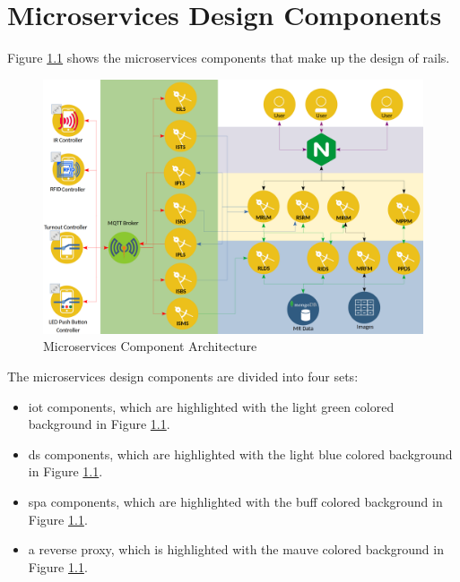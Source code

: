 \chapter{Microservices Design Components}
Figure \ref{fig:microarchitecture} shows the microservices components that make up the design of \gls{rails}.

\begin{figure}[H]
	\centering
		\includegraphics[scale=0.15]{../Images/micro-services-arch.png}
	\caption{Microservices Component Architecture}
	\label{fig:microarchitecture}
\end{figure}

The microservices design components are divided into four sets:
\begin{itemize}
  \item \gls{iot} components, which are highlighted with the light green colored background in Figure \ref{fig:microarchitecture}.
  \item \gls{ds} components, which are highlighted with the light blue colored background in Figure \ref{fig:microarchitecture}.
  \item \gls{spa} components, which are highlighted with the buff colored background in Figure \ref{fig:microarchitecture}.
  \item a reverse proxy, which is highlighted with the mauve colored background in Figure \ref{fig:microarchitecture}.
\end{itemize}

